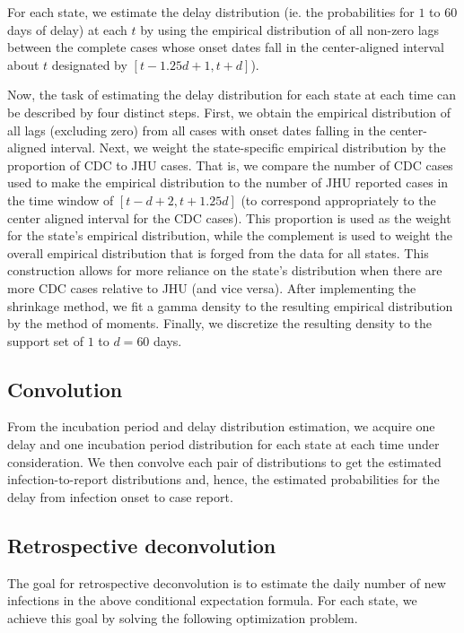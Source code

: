 \documentclass{article}
\begin{document}
For each state, we estimate the delay distribution (ie. the probabilities for $1$ to $60$ days of delay) at each $t$ by using the empirical distribution of all non-zero lags between the complete cases whose onset dates fall in the center-aligned interval about $t$ designated by $\left [ t - 1.25d + 1, t + d \right ]$). 

Now, the task of estimating the delay distribution for each state at each time can be described by four distinct steps. First, we obtain the empirical distribution of all lags (excluding zero) from all cases with onset dates falling in the center-aligned interval. Next, we weight the state-specific empirical distribution by the proportion of CDC to JHU cases. That is, we compare the number of CDC cases used to make the empirical distribution to the number of JHU reported cases in the time window of $\left [t - d + 2, t + 1.25d\right ]$ (to correspond appropriately to the center aligned interval for the CDC cases). This proportion is used as the weight for the state’s empirical distribution, while the complement is used to weight the overall empirical distribution that is forged from the data for all states. This construction allows for more reliance on the state’s distribution when there are more CDC cases relative to JHU (and vice versa). After implementing the shrinkage method, we fit a gamma density to the resulting empirical distribution by the method of moments. Finally, we discretize the resulting density to the support set of $1$ to $d = 60$ days.
 
\subsection{Convolution} From the incubation period and delay distribution estimation, we acquire one delay and one incubation period distribution for each state at each time under consideration. We then convolve each pair of distributions to get the estimated infection-to-report distributions and, hence, the estimated probabilities for the delay from infection onset to case report. 

\subsection{Retrospective deconvolution} The goal for retrospective deconvolution is to estimate the daily number of new infections in the above conditional expectation formula. For each state, we achieve this goal by solving the following optimization problem. 
\end{document}
